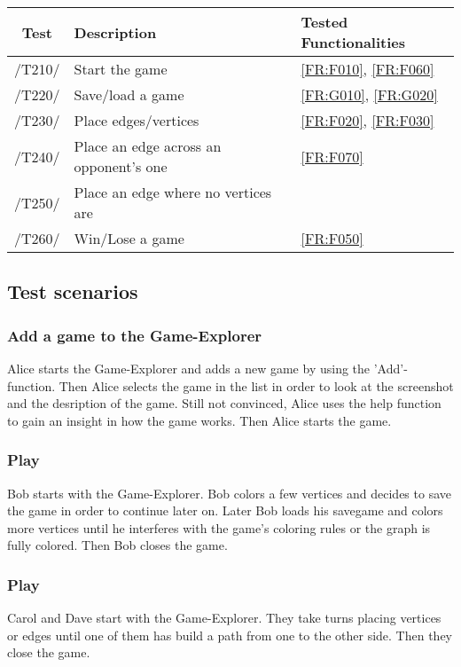 \begin{tabular}{cll}

\hline
\textbf{Test} & \textbf{Description} & \textbf{Tested Functionalities} \\
\hline
/T210/ & Start the game & \ref{FR:F010}, \ref{FR:F060} \\
/T220/ & Save/load a game & \ref{FR:G010}, \ref{FR:G020} \\
/T230/ & Place edges/vertices & \ref{FR:F020}, \ref{FR:F030} \\
/T240/ & Place an edge across an opponent's one & \ref{FR:F070} \\
/T250/ & Place an edge where no vertices are & \\
/T260/ & Win/Lose a game & \ref{FR:F050} \\
\hline

\end{tabular}

\subsection{Test scenarios}

\subsubsection{Add a game to the Game-Explorer}

Alice starts the Game-Explorer and adds a new game by using the 'Add'-function. Then Alice selects the game in the list in order to look at the screenshot and the desription of the game. Still not convinced, Alice uses the help function to gain an insight in how the game works. Then Alice starts the game.

\subsubsection{Play \graphcoloring}

Bob starts {\graphcoloring} with the Game-Explorer. Bob colors a few vertices and decides to save the game in order to continue later on. Later Bob loads his savegame and colors more vertices until he interferes with the game's coloring rules or the graph is fully colored. Then Bob closes the game.

\subsubsection{Play \twixt}

Carol and Dave start {\twixt} with the Game-Explorer. They take turns placing vertices or edges until one of them has build a path from one to the other side. Then they close the game.